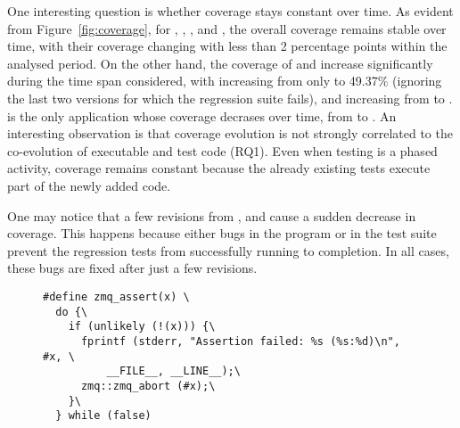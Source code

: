One interesting question is whether coverage stays constant over time.
As evident from Figure~\ref{fig:coverage}, for \binutils, \git,
\memcached, and \redis, the overall coverage remains stable over time,
with their coverage changing with less than 2 percentage points within
the analysed period. On the other hand, the coverage of
\lighttpdtwo and \zeromq increase significantly during the time span
considered, with \lighttpdtwo increasing from only
\lighttpdtwoInitialCoverage to 49.37\% (ignoring the last two
versions for which the regression suite fails), and \zeromq increasing
from \zeromqInitialCoverage to \zeromqFinalCoverage. \beanstalkd is the only
application whose coverage decrases over time, from \beanstalkdInitialCoverage
to \beanstalkdFinalCoverage. An interesting observation is that coverage
evolution is not strongly correlated to the co-evolution of executable and test
code (RQ1). Even when testing is a phased activity, coverage remains constant
because the already existing tests execute part of the newly added code.


One may notice that a few revisions from \lighttpdtwo, \memcached and \redis
cause a sudden decrease in coverage. This happens because either bugs in the
program or in the test suite prevent the regression tests from
successfully running to completion. In all cases, these bugs are fixed
after just a few revisions.

\begin{figure}[t]
\begin{lstlisting}[label=lst:zeromqassert,basicstyle=\footnotesize\ttfamily,xleftmargin=0pt,numbers=none,caption={Example of an assertion macro used in \zeromq codebase.}]
#define zmq_assert(x) \
  do {\
    if (unlikely (!(x))) {\
      fprintf (stderr, "Assertion failed: %s (%s:%d)\n", #x, \
          __FILE__, __LINE__);\
      zmq::zmq_abort (#x);\
    }\
  } while (false)
\end{lstlisting}
\end{figure}

